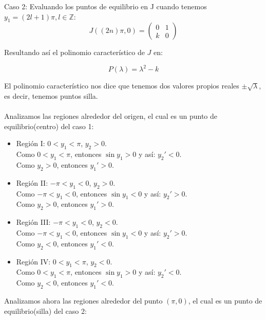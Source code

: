 \documentclass[10pt,letterpaper,titlepage]{article}
\begin{document}
Caso 2: Evaluando los puntos de equilibrio en J cuando tenemos $y_{1}= (2l+1)\pi, l \in \mathbb{Z}$:
\[
	J((2n) \pi,0) = \begin{pmatrix}
		0 & 1\\
		k & 0
	\end{pmatrix}
\]

Resultando as\'i el polinomio caracter\'istico de $J$ en:

\begin{equation}
	P(\lambda) = \lambda ^{2} - k
\end{equation}

El polinomio caracter\'istico nos dice que tenemos dos valores propios reales $\pm \sqrt{\lambda}$, es decir, tenemos puntos silla.\\\\
Analizamos las regiones alrededor del origen, el cual es un punto de equilibrio(centro) del caso 1:

\begin{itemize}
	\item Regi\'on I: $0<y_{1}< \pi$, $y_{2}>0$.\\
		Como $0<y_{1}< \pi$, entonces $\sin y_{1} > 0$ y as\'i: $y_{2}' <0$.\\
		Como $y_{2}>0$, entonces $y_{1}'>0$.
	\item Regi\'on II: $- \pi<y_{1}< 0$, $y_{2}>0$.\\
		Como $- \pi<y_{1}< 0$, entonces $\sin y_{1} < 0$ y as\'i: $y_{2}' >0$.\\
		Como $y_{2}>0$, entonces $y_{1}'>0$.
	\item Regi\'on III: $- \pi<y_{1}< 0$, $y_{2}<0$.\\
		Como $- \pi<y_{1}< 0$, entonces $\sin y_{1} < 0$ y as\'i: $y_{2}' >0$.\\
		Como $y_{2}<0$, entonces $y_{1}'<0$.
	\item Regi\'on IV: $0<y_{1}< \pi$, $y_{2}<0$.\\
		Como $0<y_{1}< \pi$, entonces $\sin y_{1} > 0$ y as\'i: $y_{2}' <0$.\\
		Como $y_{2}<0$, entonces $y_{1}'<0$.
\end{itemize}

Analizamos ahora las regiones alrededor del punto $(\pi,0)$, el cual es un punto de equilibrio(silla) del caso 2:
\end{document}
